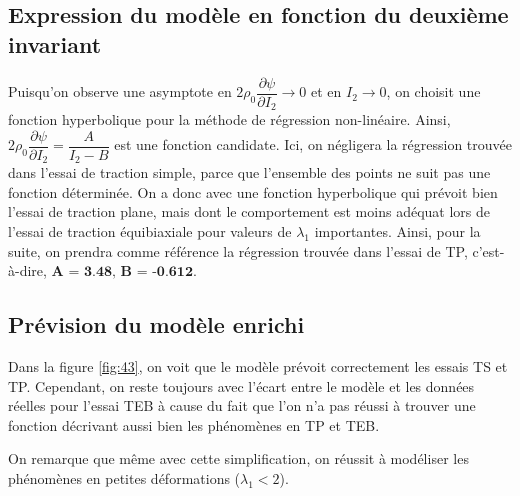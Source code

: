 \documentclass[a4paper,11pt]{article}
\begin{document}
\FloatBarrier
\subsection{Expression du modèle en fonction du deuxième invariant}
Puisqu'on observe une asymptote en $2 \rho_0 \dfrac{\partial\psi}{\partial I_2} \rightarrow 0$ et en $I_2 \rightarrow 0$, on choisit une fonction hyperbolique pour la méthode de régression non-linéaire. Ainsi, $2 \rho_0 \dfrac{\partial\psi}{\partial I_2} = \dfrac{A}{I_2-B}$ est une fonction candidate. Ici, on négligera la régression trouvée dans l'essai de traction simple, parce que l'ensemble des points ne suit pas une fonction déterminée. On a donc avec une fonction hyperbolique qui prévoit bien l'essai de traction plane, mais dont le comportement est moins adéquat lors de l'essai de traction équibiaxiale pour valeurs de $\lambda_1$ importantes. Ainsi, pour la suite, on prendra comme référence la régression trouvée dans l'essai de TP, c'est-à-dire, $\textbf{A = 3.48, B = -0.612}$.

\subsection{Prévision du modèle enrichi}
Dans la figure \ref{fig:43}, on voit que le modèle prévoit correctement les essais TS et TP. Cependant, on reste toujours avec l'écart entre le modèle et les données réelles pour l'essai TEB à cause du fait que l'on n'a pas réussi à trouver une fonction décrivant aussi bien les phénomènes en TP et TEB.

On remarque que même avec cette simplification, on réussit à modéliser les phénomènes en petites déformations ($\lambda_1 < 2$).

%
\end{document}
